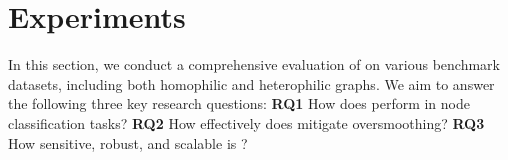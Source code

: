 
\section{Experiments}
\label{sec: exp_main}


In this section, we conduct a comprehensive evaluation of
\ours on various benchmark datasets, including both
homophilic and heterophilic graphs. We aim to answer the following three
key research questions: \textbf{RQ1} How does \ours perform in node classification tasks? \textbf{RQ2} How effectively does \ours mitigate oversmoothing? \textbf{RQ3} How sensitive, robust, and scalable is \ours?   









